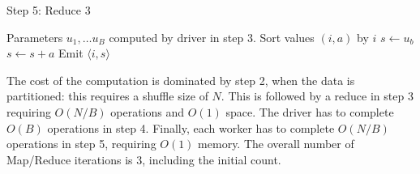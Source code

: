 \documentclass[11pt]{article}
\begin{document}
\begin{algorithm}[H]
\caption{Step 5: Reduce 3}
\begin{algorithmic}
\State Parameters $u_1,\hdots u_B$ computed by driver in step 3. 
  \State Sort values $(i, a)$ by $i$
  \State $s \leftarrow u_b$
    \State $s \leftarrow s + a$
    \State Emit $\langle i, s \rangle$
  \EndFor
\EndFunction
\end{algorithmic}
\end{algorithm}

The cost of the computation is dominated by step 2, when the data is
partitioned: this requires a shuffle size of $N$.  This is followed by
a reduce in step 3 requiring $O(N/B)$ operations and $O(1)$ space.
The driver has to complete $O(B)$ operations in step 4.  Finally, each
worker has to complete $O(N/B)$ operations in step 5, requiring $O(1)$
memory.  The overall number of Map/Reduce iterations is 3, including
the initial count.
\end{document}
